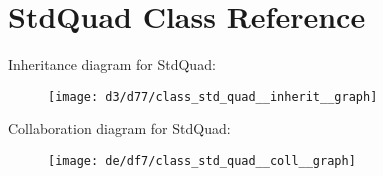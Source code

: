 \hypertarget{class_std_quad}{}\section{Std\+Quad Class Reference}
\label{class_std_quad}


Inheritance diagram for Std\+Quad\+:
\nopagebreak
\begin{figure}[H]
\begin{center}
\leavevmode
\texttt{[image: d3/d77/class\_std\_quad\_\_inherit\_\_graph]}
\end{center}
\end{figure}


Collaboration diagram for Std\+Quad\+:
\nopagebreak
\begin{figure}[H]
\begin{center}
\leavevmode
\texttt{[image: de/df7/class\_std\_quad\_\_coll\_\_graph]}
\end{center}
\end{figure}
